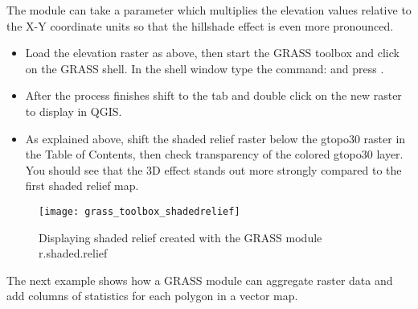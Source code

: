 The module  can take a parameter 
which multiplies the elevation values relative to the X-Y coordinate units so
that the hillshade effect is even more pronounced. 

\begin{itemize}
\item Load the  elevation raster as above, then start the
GRASS toolbox and click on the GRASS shell. In the shell window type the
command:\linebreak
{} \linebreak and press .
\end{itemize}

\begin{itemize}
\item After the process finishes shift to the  tab and double click on
the new  raster to display in QGIS. 
\item As explained above, shift the shaded relief raster below the gtopo30
raster in the Table of Contents, then check transparency of the colored
gtopo30 layer. You should see that the 3D effect stands out more strongly
compared to the first shaded relief map.
\end{itemize}

\begin{figure}[ht]
 \begin{center}
 \caption{Displaying shaded relief created with the GRASS module
r.shaded.relief \nixcaption}\label{fig:grass_toolbox_shadedrelief}
 \texttt{[image: grass\_toolbox\_shadedrelief]}
 \end{center}
\end{figure}


The next example shows how a GRASS module can aggregate raster data and add
columns of statistics for each polygon in a vector map. 

